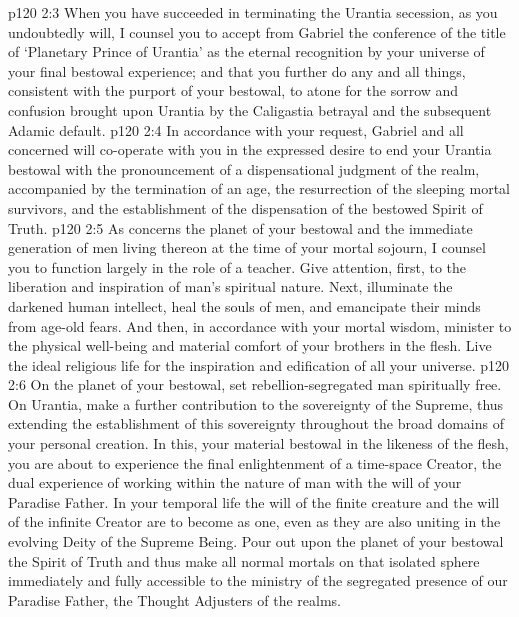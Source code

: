 \vs p120 2:3 \bibnobreakspace When you have succeeded in terminating the Urantia secession, as you undoubtedly will, I counsel you to accept from Gabriel the conference of the title of ‘Planetary Prince of Urantia’ as the eternal recognition by your universe of your final bestowal experience; and that you further do any and all things, consistent with the purport of your bestowal, to atone for the sorrow and confusion brought upon Urantia by the Caligastia betrayal and the subsequent Adamic default.
\vs p120 2:4 \bibnobreakspace In accordance with your request, Gabriel and all concerned will co\hyp{}operate with you in the expressed desire to end your Urantia bestowal with the pronouncement of a dispensational judgment of the realm, accompanied by the termination of an age, the resurrection of the sleeping mortal survivors, and the establishment of the dispensation of the bestowed Spirit of Truth.
\vs p120 2:5 \bibnobreakspace As concerns the planet of your bestowal and the immediate generation of men living thereon at the time of your mortal sojourn, I counsel you to function largely in the role of a teacher. Give attention, first, to the liberation and inspiration of man’s spiritual nature. Next, illuminate the darkened human intellect, heal the souls of men, and emancipate their minds from age\hyp{}old fears. And then, in accordance with your mortal wisdom, minister to the physical well\hyp{}being and material comfort of your brothers in the flesh. Live the ideal religious life for the inspiration and edification of all your universe.
\vs p120 2:6 \bibnobreakspace On the planet of your bestowal, set rebellion\hyp{}segregated man spiritually free. On Urantia, make a further contribution to the sovereignty of the Supreme, thus extending the establishment of this sovereignty throughout the broad domains of your personal creation. In this, your material bestowal in the likeness of the flesh, you are about to experience the final enlightenment of a time\hyp{}space Creator, the dual experience of working within the nature of man with the will of your Paradise Father. In your temporal life the will of the finite creature and the will of the infinite Creator are to become as one, even as they are also uniting in the evolving Deity of the Supreme Being. Pour out upon the planet of your bestowal the Spirit of Truth and thus make all normal mortals on that isolated sphere immediately and fully accessible to the ministry of the segregated presence of our Paradise Father, the Thought Adjusters of the realms.
